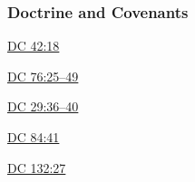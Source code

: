 	\subsubsection{Doctrine and Covenants} %
		\label{SONSOFPERDITION-DC}
	
		
		\begin{compactdesc}
			\item[{\hyperref[DC42-18]{DC 42:18}}]
			\item[{\hyperref[DC76-25]{DC 76:25--49}}]
			\item[{\hyperref[DC29-36]{DC 29:36--40}}]
			\item[{\hyperref[DC84-41]{DC 84:41}}]
			\item[{\hyperref[DC132-27]{DC 132:27}}]
		\end{compactdesc}
		
	
		
		

	

